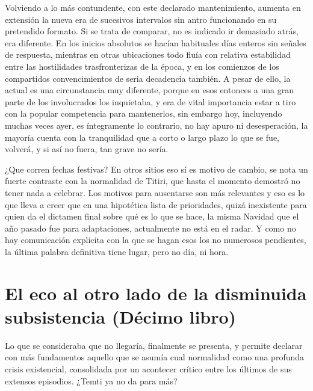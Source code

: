 \documentclass[
]{book}
\begin{document}
Volviendo a lo más contundente, con este declarado mantenimiento, aumenta en extensión la nueva era de sucesivos intervalos sin antro funcionando en su pretendido formato. Si se trata de comparar, no es indicado ir demasiado atrás, era diferente. En los inicios absolutos se hacían habituales días enteros sin señales de respuesta, mientras en otras ubicaciones todo fluía con relativa estabilidad entre las hostilidades trasfronterizas de la época, y en los comienzos de los compartidos convencimientos de seria decadencia también. A pesar de ello, la actual es una circunstancia muy diferente, porque en esos entonces a una gran parte de los involucrados los inquietaba, y era de vital importancia estar a tiro con la popular competencia para mantenerlos, sin embargo hoy, incluyendo muchas veces ayer, es íntegramente lo contrario, no hay apuro ni desesperación, la mayoría cuenta con la tranquilidad que a corto o largo plazo lo que se fue, volverá, y si así no fuera, tan grave no sería.

¿Que corren fechas festivas? En otros sitios eso sí es motivo de cambio, se nota un fuerte contraste con la normalidad de Titiri, que hasta el momento demostró no tener nada a celebrar. Los motivos para ausentarse son más relevantes y eso es lo que lleva a creer que en una hipotética lista de prioridades, quizá inexistente para quien da el dictamen final sobre qué es lo que se hace, la misma Navidad que el año pasado fue para adaptaciones, actualmente no está en el radar. Y como no hay comunicación explicita con la que se hagan esos los no numerosos pendientes, la última palabra definitiva tiene lugar, pero no día, ni hora.

\hypertarget{el-eco-al-otro-lado-de-la-disminuida-subsistencia-duxe9cimo-libro}{%
\chapter{El eco al otro lado de la disminuida subsistencia (Décimo libro)}\label{el-eco-al-otro-lado-de-la-disminuida-subsistencia-duxe9cimo-libro}}

Lo que se consideraba que no llegaría, finalmente se presenta, y permite declarar con más fundamentos aquello que se asumía cual normalidad como una profunda crisis existencial, consolidada por un acontecer crítico entre los últimos de sus extensos episodios. ¿Temti ya no da para más?
\end{document}
